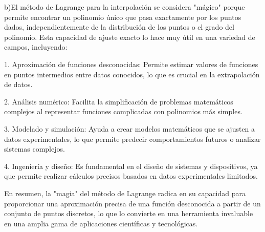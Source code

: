 \documentclass[a4paper,12pt]{article}
\begin{document}
b)El método de Lagrange para la interpolación se considera "mágico" porque permite encontrar un polinomio único que pasa exactamente por los puntos dados, independientemente de la distribución de los puntos o el grado del polinomio. Esta capacidad de ajuste exacto lo hace muy útil en una variedad de campos, incluyendo:

1. Aproximación de funciones desconocidas: Permite estimar valores de funciones en puntos intermedios entre datos conocidos, lo que es crucial en la extrapolación de datos.

2. Análisis numérico: Facilita la simplificación de problemas matemáticos complejos al representar funciones complicadas con polinomios más simples.

3. Modelado y simulación: Ayuda a crear modelos matemáticos que se ajusten a datos experimentales, lo que permite predecir comportamientos futuros o analizar sistemas complejos.

4. Ingeniería y diseño: Es fundamental en el diseño de sistemas y dispositivos, ya que permite realizar cálculos precisos basados en datos experimentales limitados.

En resumen, la "magia" del método de Lagrange radica en su capacidad para proporcionar una aproximación precisa de una función desconocida a partir de un conjunto de puntos discretos, lo que lo convierte en una herramienta invaluable en una amplia gama de aplicaciones científicas y tecnológicas.
\end{document}
